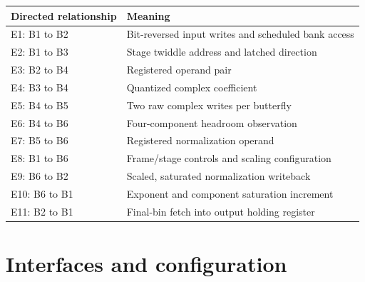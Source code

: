 \documentclass[11pt,a4paper]{article}
\begin{document}
{\small\renewcommand{\arraystretch}{1.18}\begin{longtable}{@{}L{0.24\textwidth}|L{0.7\textwidth}@{}}\toprule

\textbf{Directed relationship} & \textbf{Meaning}\\\midrule\endhead

E1: B1 to B2 & Bit-reversed input writes and scheduled bank access\\[2pt]\hline

E2: B1 to B3 & Stage twiddle address and latched direction\\[2pt]\hline

E3: B2 to B4 & Registered operand pair\\[2pt]\hline

E4: B3 to B4 & Quantized complex coefficient\\[2pt]\hline

E5: B4 to B5 & Two raw complex writes per butterfly\\[2pt]\hline

E6: B4 to B6 & Four-component headroom observation\\[2pt]\hline

E7: B5 to B6 & Registered normalization operand\\[2pt]\hline

E8: B1 to B6 & Frame/\allowbreak{}stage controls and scaling configuration\\[2pt]\hline

E9: B6 to B2 & Scaled,\allowbreak{} saturated normalization writeback\\[2pt]\hline

E10: B6 to B1 & Exponent and component saturation increment\\[2pt]\hline

E11: B2 to B1 & Final-bin fetch into output holding register\\[2pt]\hline

\bottomrule\end{longtable}}

\section{Interfaces and configuration}
\end{document}

